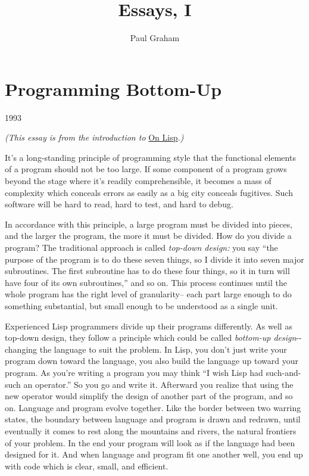 \documentclass[12pt]{book}
\title{Essays, I}
\author{Paul Graham}
\date{}
\begin{document}
\frontmatter
\maketitle
\tableofcontents
\clearpage
\mainmatter

\chapter{Programming Bottom-Up}

1993

\emph{(This essay is from the introduction to} \href{onlisp.html}{On
Lisp}\emph{.)}

It's a long-standing principle of programming style that the functional
elements of a program should not be too large. If some component of a
program grows beyond the stage where it's readily comprehensible, it
becomes a mass of complexity which conceals errors as easily as a big
city conceals fugitives. Such software will be hard to read, hard to
test, and hard to debug.

In accordance with this principle, a large program must be divided into
pieces, and the larger the program, the more it must be divided. How do
you divide a program? The traditional approach is called \emph{top-down
design:} you say ``the purpose of the program is to do these seven
things, so I divide it into seven major subroutines. The first
subroutine has to do these four things, so it in turn will have four of
its own subroutines,'' and so on. This process continues until the whole
program has the right level of granularity-- each part large enough to
do something substantial, but small enough to be understood as a single
unit.

Experienced Lisp programmers divide up their programs differently. As
well as top-down design, they follow a principle which could be called
\emph{bottom-up design}-\/- changing the language to suit the problem.
In Lisp, you don't just write your program down toward the language, you
also build the language up toward your program. As you're writing a
program you may think ``I wish Lisp had such-and-such an operator.'' So
you go and write it. Afterward you realize that using the new operator
would simplify the design of another part of the program, and so on.
Language and program evolve together. Like the border between two
warring states, the boundary between language and program is drawn and
redrawn, until eventually it comes to rest along the mountains and
rivers, the natural frontiers of your problem. In the end your program
will look as if the language had been designed for it. And when language
and program fit one another well, you end up with code which is clear,
small, and efficient.
\end{document}
